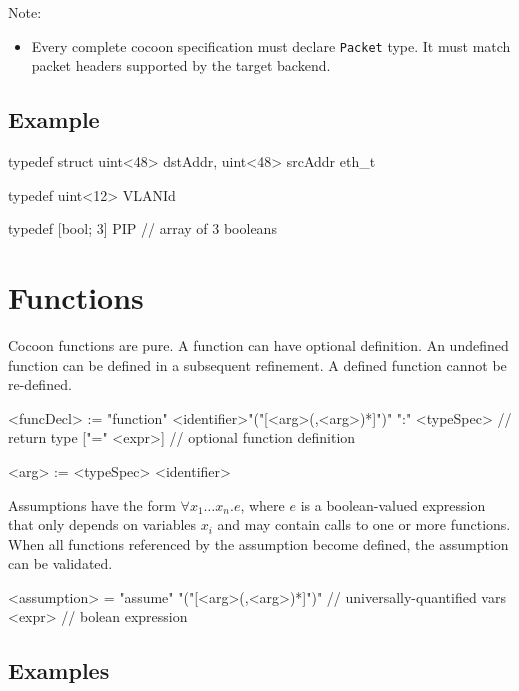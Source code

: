 \documentclass{report}
\begin{document}
Note:
\begin{itemize}
    \item Every complete cocoon specification must declare \texttt{Packet} type.
        It must match packet headers supported by the target backend.
\end{itemize}

\subsection*{Example}

\begin{ccnlisting}{}
typedef struct {
    uint<48> dstAddr,
    uint<48> srcAddr
} eth_t

typedef uint<12> VLANId

typedef [bool; 3] PIP // array of 3 booleans
\end{ccnlisting}


\section{Functions}

Cocoon functions are pure.  A function can have optional definition.
An undefined function can be defined in a subsequent refinement.  A
defined function cannot be re-defined.

\begin{bnflisting}{}
<funcDecl> := "function" <identifier>"("[<arg>(,<arg>)*]")"
              ":" <typeSpec> // return type
              ["=" <expr>]   // optional function definition
\end{bnflisting}

\begin{bnflisting}{}
<arg> := <typeSpec> <identifier>
\end{bnflisting}

Assumptions have the form $\forall x_1\ldots x_n . e$, 
where $e$ is a boolean-valued expression that only depends on variables $x_i$ and
may contain calls to one or more functions.
When all functions referenced by the assumption become defined, the assumption can be
validated.

\begin{bnflisting}{}
<assumption> = "assume" 
           "("[<arg>(,<arg>)*]")" // universally-quantified vars
           <expr>                 // bolean expression
\end{bnflisting}

\subsection*{Examples}
\end{document}
